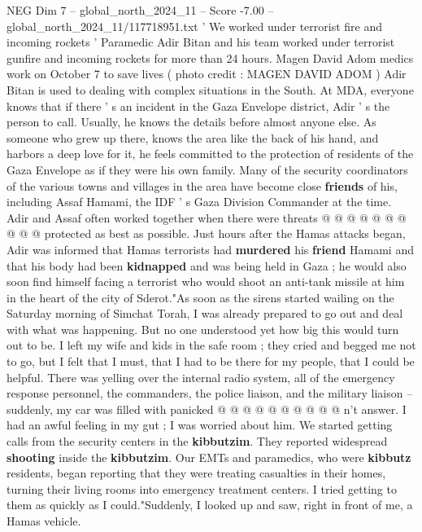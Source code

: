 \begin{textsample}{NEG Dim 7 – global\_north\_2024\_11 – Score -7.00 – global\_north\_2024\_11/117718951.txt}  \label{ex:f7_neg_254}
' We worked under terrorist fire and incoming rockets ' Paramedic Adir Bitan and his team worked under terrorist gunfire and incoming rockets for more than 24 hours.
Magen David Adom medics work on October 7 to save lives ( photo credit : MAGEN DAVID ADOM ) Adir Bitan is used to dealing with complex situations in the South.
At MDA, everyone knows that if there ' s an incident in the Gaza Envelope district, Adir ' s the person to call.
Usually, he knows the details before almost anyone else.
As someone who grew up there, knows the area like the back of his hand, and harbors a deep love for it, he feels committed to the protection of residents of the Gaza Envelope as if they were his own family.
Many of the security coordinators of the various towns and villages in the area have become close \textbf{friends} of his, including Assaf Hamami, the IDF ' s Gaza Division Commander at the time.
Adir and Assaf often worked together when there were threats @ @ @ @ @ @ @ @ @ @ protected as best as possible.
Just hours after the Hamas attacks began, Adir was informed that Hamas terrorists had \textbf{murdered} his \textbf{friend} Hamami and that his body had been \textbf{kidnapped} and was being held in Gaza ; he would also soon find himself facing a terrorist who would shoot an anti-tank missile at him in the heart of the city of Sderot."As soon as the sirens started wailing on the Saturday morning of Simchat Torah, I was already prepared to go out and deal with what was happening.
But no one understood yet how big this would turn out to be.
I left my wife and kids in the safe room ; they cried and begged me not to go, but I felt that I must, that I had to be there for my people, that I could be helpful.
There was yelling over the internal radio system, all of the emergency response personnel, the commanders, the police liaison, and the military liaison -- suddenly, my car was filled with panicked @ @ @ @ @ @ @ @ @ @ n't answer.
I had an awful feeling in my gut ; I was worried about him.
We started getting calls from the security centers in the \textbf{kibbutzim}.
They reported widespread \textbf{shooting} inside the \textbf{kibbutzim}.
Our EMTs and paramedics, who were \textbf{kibbutz} residents, began reporting that they were treating casualties in their homes, turning their living rooms into emergency treatment centers.
I tried getting to them as quickly as I could."Suddenly, I looked up and saw, right in front of me, a Hamas vehicle.

\end{textsample}
